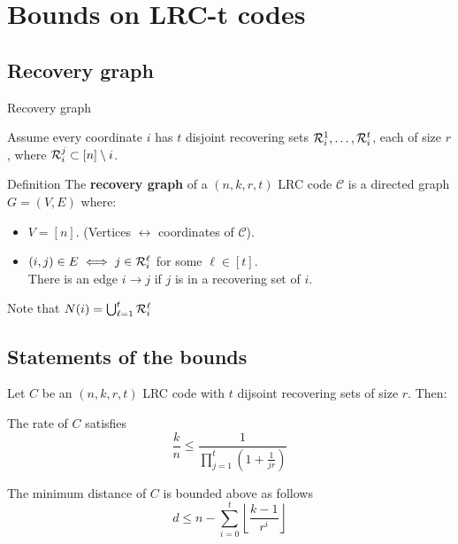 \section{Bounds on LRC-t codes}
\subsection{Recovery graph}
\begin{frame}{Recovery graph}

        Assume every coordinate $i$ has $t$ disjoint recovering sets $\mathcal{R}_i^1, \dots, \mathcal{R}_i^t$, each of size $r$, where $\mathcal{R}_i^j \subset \left[n \right] \setminus i$.
        \begin{block}{Definition}
            The \textbf{recovery graph} of a $(n,k,r,t)$ LRC code $\mathcal{C}$ is a directed graph $G=(V,E)$ where:
            \begin{itemize}
                \item $V = \left[n \right]$. (Vertices $\leftrightarrow$ coordinates of $\mathcal{C}$).
                \item $(i,j) \in E \iff j \in \mathcal{R}_i^\ell$ for some $\ell \in \left[ t \right]$.\\
                There is an edge $i \rightarrow j$ if $j$ is in a recovering set of $i$.\\
            \end{itemize}    
                Note that $N(i) = \bigcup_{\ell = 1}^{t} \mathcal{R}_i^\ell$
        \end{block}
    \end{frame}    
\subsection{Statements of the bounds}
\begin{frame}
    Let $C$ be an $(n,k,r,t)$ LRC code with $t$ dijsoint recovering sets of size $r$. Then:
    \begin{thm}
        \label{thm:max_rate_t}
        The rate of $C$ satisfies
        $$ \frac{k}{n} \leq \frac{1}{\prod_{j=1}^{t} (1 + \frac{1}{jr} )} $$
    \end{thm}
    
    \begin{thm}
        \label{thm:min_dist_t}
        The minimum distance of $C$ is bounded above as follows
        $$ d \leq n - \sum_{i=0}^{t} \left\lfloor \frac{k-1}{r^i} \right\rfloor $$
    \end{thm}
\end{frame}    
    
